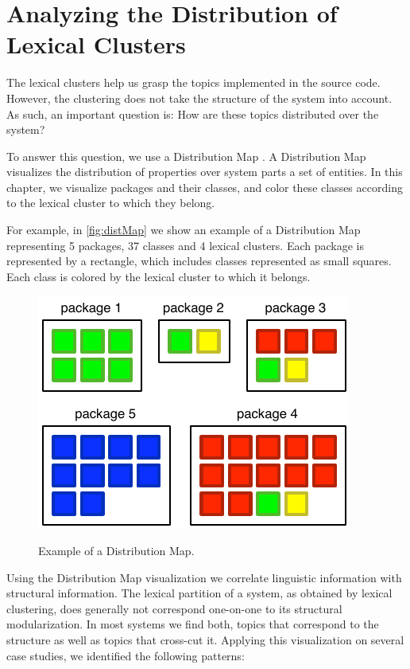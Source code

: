\section{Analyzing the Distribution of Lexical Clusters}\label{sec:distribution}

The lexical clusters help us grasp the topics implemented in the source code. However, the clustering does not take the structure of the system into account. As such, an important question is: How are these topics distributed over the system?

To answer this question, we use a Distribution Map \cite{Tuft01a,Duca06c}. A Distribution Map visualizes the distribution of properties over system parts \ie a set of entities. In this chapter, we visualize packages and their classes, and color these classes according to the lexical cluster to which they belong.

For example, in \autoref{fig:distMap} we show an example of a Distribution Map representing 5 packages, 37 classes and 4 lexical clusters. Each package is represented by a rectangle, which includes classes represented as small squares. Each class is colored by the lexical cluster to which it belongs.

\begin{figure}[h]
    \centering
  \includegraphics[width=0.4\columnwidth]{fig/hapax-distributionmap-example}\\
  \caption{Example of a Distribution Map.}\label{fig:distMap}
\end{figure}

Using the Distribution Map visualization we correlate linguistic information with structural information. The lexical partition of a system, as obtained by lexical clustering, does generally not correspond one-on-one to its structural modularization. In most systems we find both, topics that correspond to the structure as well as topics that cross-cut it. Applying this visualization on several case studies, we identified the following patterns:

